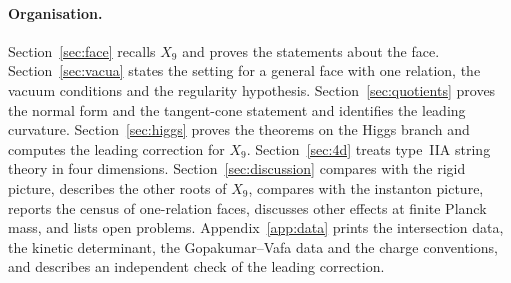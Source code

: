 \paragraph{Organisation.}
Section~\ref{sec:face} recalls $X_9$ and proves the statements about the face.
Section~\ref{sec:vacua} states the setting for a general face with one relation, the vacuum
conditions and the regularity hypothesis. Section~\ref{sec:quotients} proves the normal form and
the tangent-cone statement and identifies the leading curvature. Section~\ref{sec:higgs} proves the theorems on the Higgs branch and computes the leading correction
for $X_9$. Section~\ref{sec:4d} treats type~IIA string theory in four dimensions.
Section~\ref{sec:discussion} compares with the rigid picture, describes the other roots of $X_9$, compares
with the instanton picture, reports the census of one-relation faces, discusses other effects at finite
Planck mass, and lists open problems. Appendix~\ref{app:data} prints the intersection data, the kinetic
determinant, the Gopakumar--Vafa data and the charge conventions, and describes an independent check of
the leading correction.
